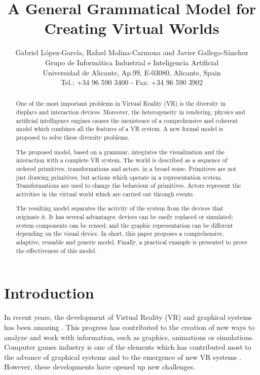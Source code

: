 \documentclass[12pt]{article}
\title{A General Grammatical Model for Creating Virtual Worlds}
\author{\small Gabriel L\'opez-Garc\'ia, 
		Rafael Molina-Carmona
        and Javier Gallego-S\'anchez 
        \\
		\small Grupo de Inform\'atica Industrial e Inteligencia Artificial\\
        \small Universidad de Alicante, Ap.99, E-03080, Alicante, Spain\\
        \small Tel.: +34 96 590 3400 - Fax:  +34 96 590 3902}
\date{}
\begin{document}
\maketitle

\begin{abstract}
One of the most important problems in Virtual Reality (VR) is the diversity in displays and interaction devices. Moreover, the heterogeneity in rendering, physics and artificial intelligence engines causes the inexistence of a comprehensive and coherent model which combines all the features of a VR system. A new formal model is proposed to solve these diversity problems.

The proposed model, based on a grammar, integrates the visualization and the interaction with a complete VR system. The world is described as a sequence of ordered primitives, transformations and actors, in a broad sense. Primitives are not just drawing primitives, but actions which operate in a representation system. Transformations are used to change the behaviour of primitives. Actors represent the activities in the virtual world which are carried out through events.

The resulting model separates the activity of the system from the devices that originate it. It has several advantages: devices can be easily replaced or simulated; system components can be reused; and the graphic representation can be different depending on the visual device. In short, this paper proposes a comprehensive, adaptive, reusable and generic model. Finally, a practical example is presented to prove the effectiveness of this model.
\end{abstract}

\section{Introduction
\label{sec:introduction}}

In recent years, the development of Virtual Reality (VR) and graphical systems has been amazing \cite{Sherman2003}.
This progress has contributed to the creation of new ways to analyze and work with information, such
as graphics, animations or simulations. Computer games industry is one of the elements which has
contributed most to the advance of graphical systems and to the emergence of new VR systems \cite{Novak2007}.
However, these developments have opened up new challenges.
\end{document}
